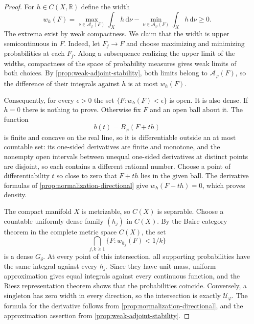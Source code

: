 \begin{proof}
For $h\in C(X,\mathbb R)$ define the width
\[
 w_h(F)=\max_{\nu\in\mathcal A_\varphi(F)}\int_Xh\,\mathrm{d}\nu
         -\min_{\nu\in\mathcal A_\varphi(F)}\int_Xh\,\mathrm{d}\nu\geq0.
\]
The extrema exist by weak compactness. We claim that the width is upper semicontinuous in $F$. Indeed, let $F_j\to F$ and choose maximizing and minimizing probabilities at each $F_j$. Along a subsequence realizing the upper limit of the widths, compactness of the space of probability measures gives weak limits of both choices. By \cref{prop:weak-adjoint-stability}, both limits belong to $\mathcal A_\varphi(F)$, so the difference of their integrals against $h$ is at most $w_h(F)$.

Consequently, for every $\epsilon>0$ the set $\{F:w_h(F)<\epsilon\}$ is open. It is also dense. If $h=0$ there is nothing to prove. Otherwise fix $F$ and an open ball about it. The function
\[
 b(t)=B_\varphi(F+th)
\]
is finite and concave on the real line, so it is differentiable outside an at most countable set: its one-sided derivatives are finite and monotone, and the nonempty open intervals between unequal one-sided derivatives at distinct points are disjoint, so each contains a different rational number. Choose a point of differentiability $t$ so close to zero that $F+th$ lies in the given ball. The derivative formulas of \cref{prop:normalization-directional} give $w_h(F+th)=0$, which proves density.

The compact manifold $X$ is metrizable, so $C(X)$ is separable. Choose a countable uniformly dense family $(h_j)$ in $C(X)$. By the Baire category theorem in the complete metric space $C(X)$, the set
\[
 \bigcap_{j,k\geq1}\{F:w_{h_j}(F)<1/k\}
\]
is a dense $G_\delta$. At every point of this intersection, all supporting probabilities have the same integral against every $h_j$. Since they have unit mass, uniform approximation gives equal integrals against every continuous function, and the Riesz representation theorem shows that the probabilities coincide. Conversely, a singleton has zero width in every direction, so the intersection is exactly $\mathscr U_\varphi$. The formula for the derivative follows from \cref{prop:normalization-directional}, and the approximation assertion from \cref{prop:weak-adjoint-stability}.
\end{proof}
